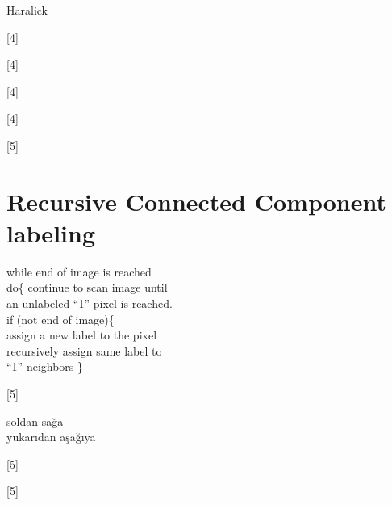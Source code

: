 \documentclass[11pt,a4paper]{article}
\begin{document}
Haralick

[4]

[4]

[4]

[4]

[5]

\section{Recursive Connected Component labeling}
\noindent while end of image is reached\\
\hspace*{1.5em}do\{ continue to scan image until\\
\hspace*{4em}an unlabeled ``1'' pixel is reached.\\
\hspace*{3em}if (not end of image)\{\\
\hspace*{6em}assign a new label to the pixel\\
\hspace*{6em}recursively assign same label to\\
\hspace*{6em}``1'' neighbors \}

[5]

soldan sağa\\
yukarıdan aşağıya

[5]

[5]
\end{document}
